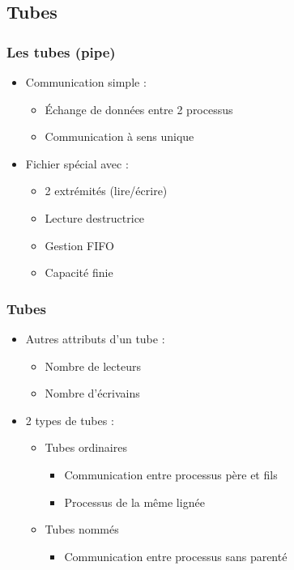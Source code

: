 \subsection{Tubes}
\begin{frame}
\frametitle{Les tubes (pipe)}
\begin{itemize}
\item Communication simple :
\begin{itemize}
\item Échange de données entre 2 processus
\item Communication à sens unique
\end{itemize}
\item Fichier spécial avec :
\begin{itemize}
\item 2 extrémités (lire/écrire)
\item Lecture destructrice
\item Gestion FIFO
\item Capacité finie
\end{itemize}
\end{itemize}
\end{frame}

\begin{frame}
\frametitle{Tubes}
\begin{itemize}
\item Autres attributs d’un tube :
\begin{itemize}
\item Nombre de lecteurs
\item Nombre d’écrivains
\end{itemize}
\item 2 types de tubes :
\begin{itemize}
\item Tubes ordinaires
\begin{itemize}
\item Communication entre processus père et fils
\item Processus de la même lignée
\end{itemize}
\item Tubes nommés
\begin{itemize}
\item Communication entre processus sans parenté
\end{itemize}
\end{itemize}
\end{itemize}
\end{frame}

